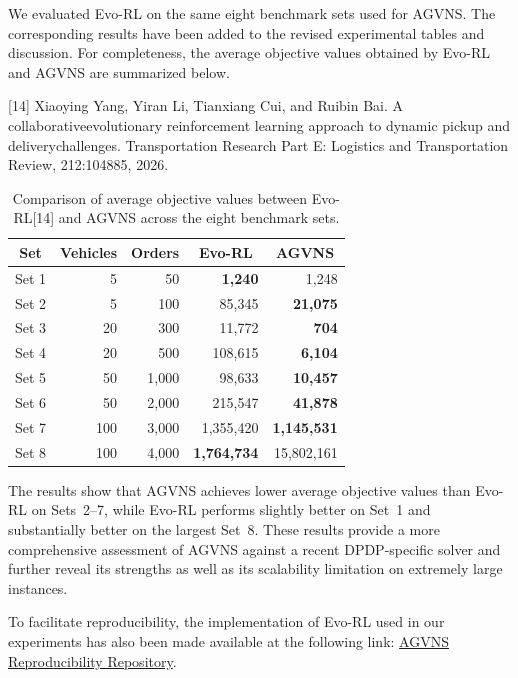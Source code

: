 \documentclass[11pt]{article}
\begin{document}
We evaluated Evo-RL on the same eight benchmark sets used for AGVNS. The corresponding results have been added to the revised experimental tables and discussion. For completeness, the average objective values obtained by Evo-RL and AGVNS are summarized below.

\noindent
{\color{blue}
   [14] Xiaoying Yang, Yiran Li, Tianxiang Cui, and Ruibin Bai. A collaborativeevolutionary reinforcement learning approach to dynamic pickup and deliverychallenges. Transportation Research Part E: Logistics and Transportation Review, 212:104885, 2026.
}

\begin{table}[htp]
\centering
\caption{Comparison of average objective values between Evo-RL[14] and AGVNS across the eight benchmark sets.}
\label{tab:evorl_agvns_response}
\begin{tabular}{c r r r r}
\toprule
\textbf{Set} & \textbf{Vehicles} & \textbf{Orders} &
\multicolumn{1}{c}{\textbf{Evo-RL}} &
\multicolumn{1}{c}{\textbf{AGVNS}} \\
\midrule
Set 1 & 5   & 50    & \textbf{1,240}     & 1,248 \\
Set 2 & 5   & 100   & 85,345             & \textbf{21,075} \\
Set 3 & 20  & 300   & 11,772             & \textbf{704} \\
Set 4 & 20  & 500   & 108,615            & \textbf{6,104} \\
Set 5 & 50  & 1,000 & 98,633             & \textbf{10,457} \\
Set 6 & 50  & 2,000 & 215,547            & \textbf{41,878} \\
Set 7 & 100 & 3,000 & 1,355,420          & \textbf{1,145,531} \\
Set 8 & 100 & 4,000 & \textbf{1,764,734} & 15,802,161 \\
\bottomrule
\end{tabular}
\end{table}

The results show that AGVNS achieves lower average objective values than Evo-RL on Sets~2--7, while Evo-RL performs slightly better on Set~1 and substantially better on the largest Set~8. These results provide a more comprehensive assessment of AGVNS against a recent DPDP-specific solver and further reveal its strengths as well as its scalability limitation on extremely large instances.

To facilitate reproducibility, the implementation of Evo-RL used in our experiments has also been made available at the following link:
\href{https://github.com/tranphuc15122004/AGVNS-Adaptive-Genetic-Algorithm-Enhanced-by-Variable-Neighborhood-Search}{AGVNS Reproducibility Repository}.
\end{document}
